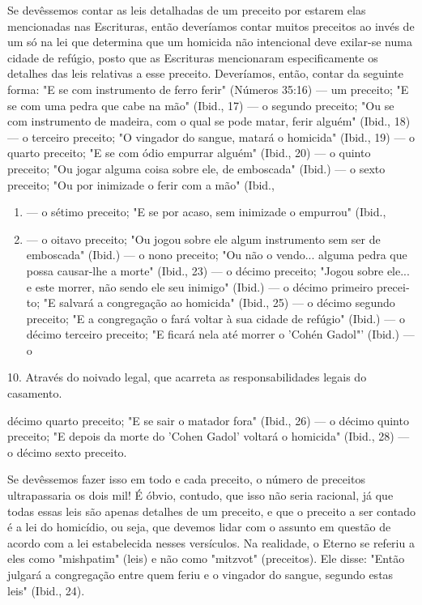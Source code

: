 \begin{itemize}
\begin{enumrate}
Se devêssemos contar as leis detalhadas de um preceito por estarem elas
mencionadas nas Escrituras, então deveríamos contar muitos preceitos ao
invés de um só na lei que determina que um homicida não intencional deve
exilar-se numa cidade de refúgio, posto que as Escrituras mencionaram
especi­ficamente os detalhes das leis relativas a esse preceito.
Deveríamos, então, con­tar da seguinte forma: "E se com instrumento de
ferro ferir" (Números 35:16) --- um preceito; "E se com uma pedra que
cabe na mão" (Ibid., 17) --- o segun­do preceito; "Ou se com instrumento
de madeira, com o qual se pode matar, ferir alguém" (Ibid., 18) --- o
terceiro preceito; "O vingador do sangue, matará o homicida" (Ibid., 19)
--- o quarto preceito; "E se com ódio empurrar alguém" (Ibid., 20) --- o
quinto preceito; "Ou jogar alguma coisa sobre ele, de embosca­da"
(Ibid.) --- o sexto preceito; "Ou por inimizade o ferir com a mão"
(Ibid.,


\begin{enumerate}
\def\labelenumi{\arabic{enumi})}
\setcounter{enumi}{20}
\item
 
 --- o sétimo preceito; "E se por acaso, sem inimizade o empurrou"
 (Ibid.,
 
\item
 
 --- o oitavo preceito; "Ou jogou sobre ele algum instrumento sem ser
 de emboscada" (Ibid.) --- o nono preceito; "Ou não o vendo... alguma
 pedra que possa causar-lhe a morte" (Ibid., 23) --- o décimo preceito;
 "Jogou sobre ele... e este morrer, não sendo ele seu inimigo" (Ibid.)
 --- o décimo primeiro precei­to; "E salvará a congregação ao homicida"
 (Ibid., 25) --- o décimo segundo pre­ceito; "E a congregação o fará
 voltar à sua cidade de refúgio" (Ibid.) --- o déci­mo terceiro
 preceito; "E ficará nela até morrer o 'Cohén Gadol"' (Ibid.) --- o
 
\end{enumerate}


10. Através do noivado legal, que acarreta as responsabilidades legais
do casamento.

décimo quarto preceito; "E se sair o matador fora" (Ibid., 26) --- o
décimo quinto preceito; "E depois da morte do 'Cohen Gadol' voltará o
homicida" (Ibid., 28) --- o décimo sexto preceito.

Se devêssemos fazer isso em todo e cada preceito, o número de pre­ceitos
ultrapassaria os dois mil! É óbvio, contudo, que isso não seria
racional, já que todas essas leis são apenas detalhes de um preceito, e
que o preceito a ser contado é a lei do homicídio, ou seja, que devemos
lidar com o assunto em questão de acordo com a lei estabelecida nesses
versículos. Na realidade, o Eterno se referiu a eles como "mishpatim"
(leis) e não como "mitzvot" (pre­ceitos). Ele disse: "Então julgará a
congregação entre quem feriu e o vingador do sangue, segundo estas leis"
(Ibid., 24).


\end{enumrate}
\end{itemize}
